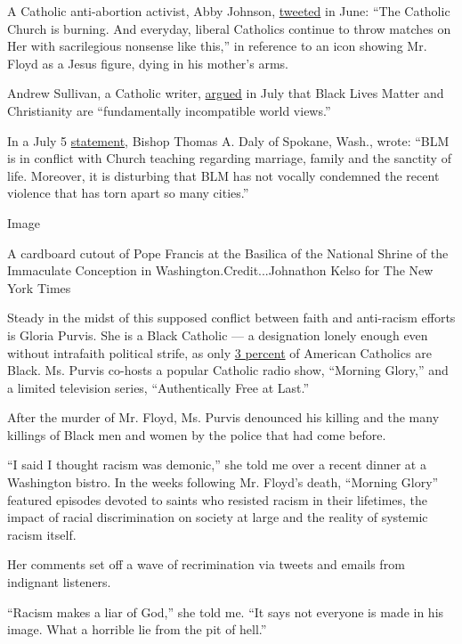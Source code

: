 A Catholic anti-abortion activist, Abby Johnson,
\href{https://twitter.com/AbbyJohnson/status/1277590055490633730}{tweeted}
in June: ``The Catholic Church is burning. And everyday, liberal
Catholics continue to throw matches on Her with sacrilegious nonsense
like this,'' in reference to an icon showing Mr. Floyd as a Jesus
figure, dying in his mother's arms.

Andrew Sullivan, a Catholic writer,
\href{https://twitter.com/sullydish/status/1287057974834462720}{argued}
in July that Black Lives Matter and Christianity are ``fundamentally
incompatible world views.''

In a July 5
\href{https://dioceseofspokane.org/news/statement-on-catholic-charities-eastern-washington-the-church-and-racism}{statement},
Bishop Thomas A. Daly of Spokane, Wash., wrote: ``BLM is in conflict
with Church teaching regarding marriage, family and the sanctity of
life. Moreover, it is disturbing that BLM has not vocally condemned the
recent violence that has torn apart so many cities.''

Image

A cardboard cutout of Pope Francis at the Basilica of the National
Shrine of the Immaculate Conception in Washington.Credit...Johnathon
Kelso for The New York Times

Steady in the midst of this supposed conflict between faith and
anti-racism efforts is Gloria Purvis. She is a Black Catholic --- a
designation lonely enough even without intrafaith political strife, as
only
\href{https://www.pewforum.org/religious-landscape-study/religious-tradition/catholic/}{3
percent} of American Catholics are Black. Ms. Purvis co-hosts a popular
Catholic radio show, ``Morning Glory,'' and a limited television series,
``Authentically Free at Last.''

After the murder of Mr. Floyd, Ms. Purvis denounced his killing and the
many killings of Black men and women by the police that had come before.

``I said I thought racism was demonic,'' she told me over a recent
dinner at a Washington bistro. In the weeks following Mr. Floyd's death,
``Morning Glory'' featured episodes devoted to saints who resisted
racism in their lifetimes, the impact of racial discrimination on
society at large and the reality of systemic racism itself.

Her comments set off a wave of recrimination via tweets and emails from
indignant listeners.

``Racism makes a liar of God,'' she told me. ``It says not everyone is
made in his image. What a horrible lie from the pit of hell.''

